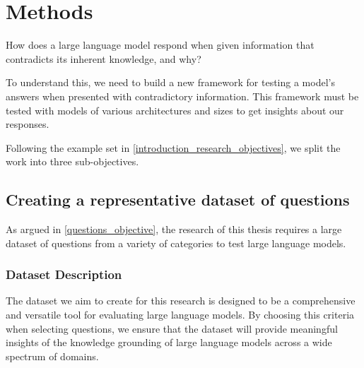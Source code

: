 \section{Methods}
\label{methods_section}

How does a large language model respond when given information that contradicts its inherent knowledge, and why?

To understand this, we need to build a new framework for testing a model's answers when presented with contradictory information.
This framework must be tested with models of various architectures and sizes to get insights about our responses.

Following the example set in \cref{introduction_research_objectives}, we split the work into three sub-objectives.

\subsection{Creating a representative dataset of questions}
\label{creating_dataset}

As argued in \cref{questions_objective}, the research of this thesis requires a large dataset of questions from a variety of categories to test large language models.

\subsubsection{Dataset Description}

The dataset we aim to create for this research is designed to be a comprehensive and versatile tool for evaluating large language models.
By choosing this criteria when selecting questions, we ensure that the dataset will provide meaningful insights of the knowledge grounding of large language models across a wide spectrum of domains.

